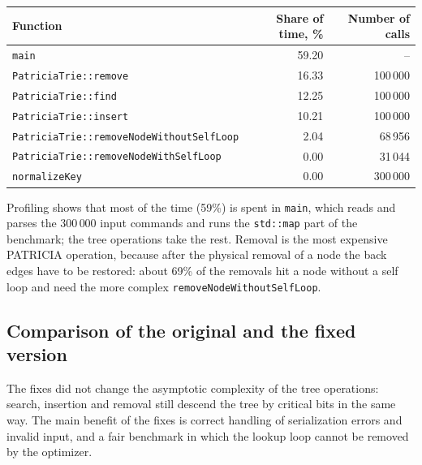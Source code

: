 \begin{table}[!ht]
\centering
\begin{tabular}{|l|r|r|}
\hline
\rowcolor{lightgray}
Function & Share of time, \% & Number of calls \\
\hline
\texttt{main} & 59.20 & -- \\
\hline
\texttt{PatriciaTrie::remove} & 16.33 & 100\,000 \\
\hline
\texttt{PatriciaTrie::find} & 12.25 & 100\,000 \\
\hline
\texttt{PatriciaTrie::insert} & 10.21 & 100\,000 \\
\hline
\texttt{PatriciaTrie::removeNodeWithoutSelfLoop} & 2.04 & 68\,956 \\
\hline
\texttt{PatriciaTrie::removeNodeWithSelfLoop} & 0.00 & 31\,044 \\
\hline
\texttt{normalizeKey} & 0.00 & 300\,000 \\
\hline
\end{tabular}
\end{table}

Profiling shows that most of the time (59\%) is spent in \texttt{main}, which reads and parses
the $300\,000$ input commands and runs the \texttt{std::map} part of the benchmark; the tree
operations take the rest. Removal is the most expensive PATRICIA operation, because after the
physical removal of a node the back edges have to be restored: about 69\% of the removals hit a
node without a self loop and need the more complex \texttt{removeNodeWithoutSelfLoop}.

\subsection{Comparison of the original and the fixed version}

The fixes did not change the asymptotic complexity of the tree operations: search, insertion and
removal still descend the tree by critical bits in the same way. The main benefit of the fixes is
correct handling of serialization errors and invalid input, and a fair benchmark in which the
lookup loop cannot be removed by the optimizer.

\pagebreak
